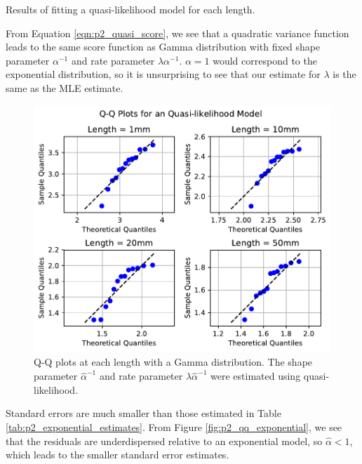 \documentclass[letterpaper,11pt]{article}
\begin{document}
\begin{enumerate}
\begin{enumerate}
\begin{description}
        \begin{table}
          \centering
          
          \caption{Results of fitting a quasi-likelihood model for each length.}
          \label{tab:p2_quasi_likelihood_estimates}
        \end{table}

        From Equation \ref{eqn:p2_quasi_score}, we see that a quadratic variance
        function leads to the same score function as Gamma distribution
        with fixed shape parameter $\alpha^{-1}$ and rate parameter
        $\lambda\alpha^{-1}$. $\alpha = 1$ would correspond to the
        exponential distribution, so it is unsurprising to see that our estimate
        for $\lambda$ is the same as the MLE estimate.

        \begin{figure}
          \centering
          \includegraphics{p2_qq_quasi_likelihood.pdf}
          \caption{Q-Q plots at each length with a Gamma distribution. The shape
            parameter $\hat{\alpha}^{-1}$ and rate parameter
            $\hat{\lambda}\hat{\alpha}^{-1}$ were estimated using
            quasi-likelihood.}
          \label{fig:p2_qq_quasi_likelihood}
        \end{figure}
        
        Standard errors are much smaller than those estimated in Table
        \ref{tab:p2_exponential_estimates}. From Figure
        \ref{fig:p2_qq_exponential}, we see that the residuals are
        underdispersed relative to an exponential model, so $\hat{\alpha} < 1$,
        which leads to the smaller standard error estimates.


\end{description}
\end{enumerate}
\end{enumerate}
\end{document}
